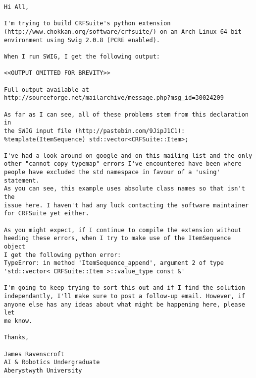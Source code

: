 \begin{verbatim}
Hi All,

I'm trying to build CRFSuite's python extension 
(http://www.chokkan.org/software/crfsuite/) on an Arch Linux 64-bit 
environment using Swig 2.0.8 (PCRE enabled).

When I run SWIG, I get the following output:

<<OUTPUT OMITTED FOR BREVITY>>

Full output available at http://sourceforge.net/mailarchive/message.php?msg_id=30024209

As far as I can see, all of these problems stem from this declaration in 
the SWIG input file (http://pastebin.com/9JipJ1C1):
%template(ItemSequence) std::vector<CRFSuite::Item>;

I've had a look around on google and on this mailing list and the only 
other "cannot copy typemap" errors I've encountered have been where 
people have excluded the std namespace in favour of a 'using' statement. 
As you can see, this example uses absolute class names so that isn't the 
issue here. I haven't had any luck contacting the software maintainer 
for CRFSuite yet either.

As you might expect, if I continue to compile the extension without 
heeding these errors, when I try to make use of the ItemSequence object 
I get the following python error:
TypeError: in method 'ItemSequence_append', argument 2 of type 
'std::vector< CRFSuite::Item >::value_type const &'

I'm going to keep trying to sort this out and if I find the solution 
independantly, I'll make sure to post a follow-up email. However, if 
anyone else has any ideas about what might be happening here, please let 
me know.

Thanks,

James Ravenscroft
AI & Robotics Undergraduate
Aberystwyth University
\end{verbatim}
